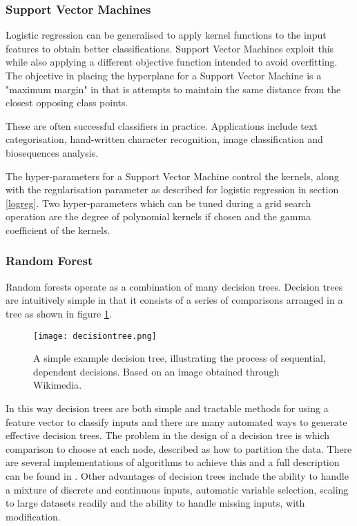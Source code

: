 \subsubsection*{Support Vector Machines}
Logistic regression can be generalised to apply kernel functions to the input features to obtain better classifications.
Support Vector Machines exploit this while also applying a different objective function intended to avoid overfitting\autocite[383]{murphy_machine_2012}.
The objective in placing the hyperplane for a Support Vector Machine is a "maximum margin" in that is attempts to maintain the same distance from the closest opposing class points.

These are often successful classifiers in practice.
Applications include text categorisation, hand-written character recognition, image classification and biosequences analysis\autocite{cristianini_introduction_2000}.

The hyper-parameters for a Support Vector Machine control the kernels, along with the regularisation parameter as described for logistic regression in section \ref{logreg}.
Two hyper-parameters which can be tuned during a grid search operation are the degree of polynomial kernels if chosen and the gamma coefficient of the kernels.


\subsubsection*{Random Forest}
\label{randomforest}

Random forests operate as a combination of many decision trees.
Decision trees are intuitively simple in that it consists of a series of comparisons arranged in a tree as shown in figure \ref{fig:dectree}.

\begin{figure}
    \centering
    \texttt{[image: decisiontree.png]}
    \caption{A simple example decision tree, illustrating the process of sequential, dependent decisions. Based on an image obtained through Wikimedia\autocite{wkmdacommons}.}
    \label{fig:dectree}
\end{figure}

In this way decision trees are both simple and tractable methods for using a feature vector to classify inputs and there are many automated ways to generate effective decision trees.
The problem in the design of a decision tree is which comparison to choose at each node, described as how to partition the data\autocite[544]{murphy_machine_2012}. %
There are several implementations of algorithms to achieve this and a full description can be found in \textcite[544]{murphy_machine_2012}.
Other advantages of decision trees include the ability to handle a mixture of discrete and continuous inputs, automatic variable selection, scaling to large datasets readily and the ability to handle missing inputs, with modification.

